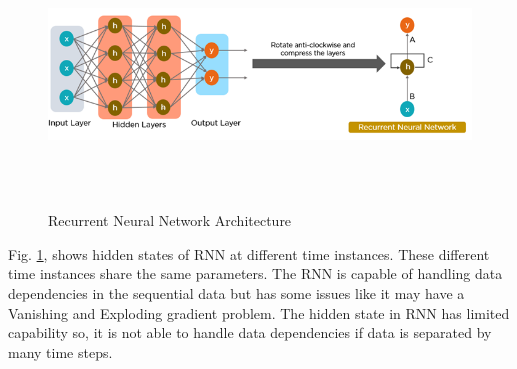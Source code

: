 \documentclass{ws-ijait}
\begin{document}
\begin{center}
	\begin{figure}[!htbp]
		\centering
		\includegraphics[width=15cm, height=7cm]{rnn1.png}
		\caption{Recurrent Neural Network Architecture}
		\label{figrnn1}
	\end{figure}
\end{center}


Fig. \ref{figrnn1}, shows hidden states of RNN at different time instances. These different time instances share the same parameters. The RNN is capable of handling data dependencies in the sequential data but has some issues like it may have a Vanishing and Exploding gradient problem. The hidden state in RNN has limited capability so, it is not able to handle data dependencies if data is separated by many time steps.
\end{document}
